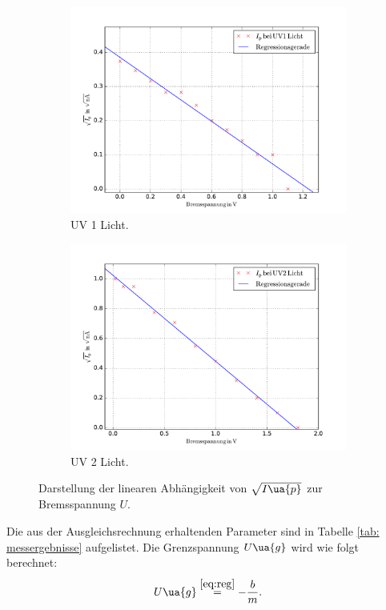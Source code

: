 \begin{figure}
  \centering
  \begin{subfigure}{0.48\textwidth}
    \centering
    \includegraphics[width=1 \textwidth]{../Messdaten/uv_eins.pdf}
    \caption{UV 1 Licht.}
    \label{fig: uv_eins}
  \end{subfigure}
  \begin{subfigure}{0.48\textwidth}
    \centering
    \includegraphics[width=1 \textwidth]{../Messdaten/uv_zwei.pdf}
    \caption{UV 2 Licht.}
    \label{fig: uv_zwei}
  \end{subfigure}
  \caption{Darstellung der linearen Abhängigkeit von $\sqrt{I\ua{p}}$ zur Bremsspannung $U$.}
  \label{fig: darstellung_3}
\end{figure}
Die aus der Ausgleichsrechnung erhaltenden Parameter sind in Tabelle
\ref{tab: messergebnisse} aufgelistet. Die Grenzspannung $U\ua{g}$ wird
wie folgt berechnet:
\begin{equation}
  \label{eq:ug}
  U\ua{g}\overset{\ref{eq:reg}}{=}-\frac{b}{m}.
\end{equation}



